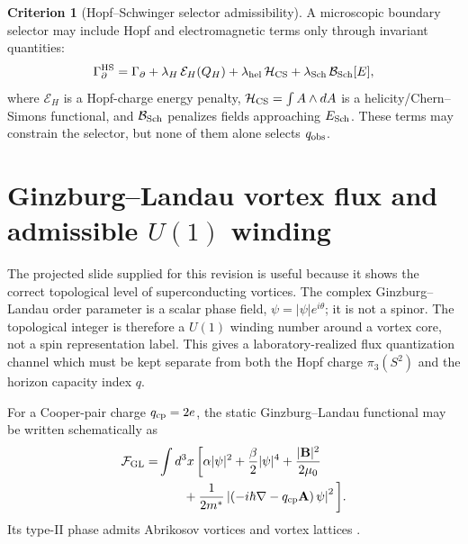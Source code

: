 \documentclass[aps,prd,reprint,nofootinbib,superscriptaddress,floatfix]{revtex4-2}
\numberwithin{equation}{section}
\theoremstyle{definition}
\newtheorem{criterion}{Criterion}[section]
\theoremstyle{plain}
\begin{document}
\begin{criterion}[Hopf--Schwinger selector admissibility]
A microscopic boundary selector may include Hopf and electromagnetic
terms only through invariant quantities:
\begin{equation}
\Gamma_\partial^{\rm HS}
=
\Gamma_\partial
+
\lambda_H\,\mathcal E_H(Q_H)
+
\lambda_{\rm hel}\,\mathcal H_{\rm CS}
+
\lambda_{\rm Sch}\,\mathcal B_{\rm Sch}[E],
\end{equation}
where \(\mathcal E_H\) is a Hopf-charge energy penalty,
\(\mathcal H_{\rm CS}=\int A\wedge dA\) is a helicity/Chern--Simons
functional, and \(\mathcal B_{\rm Sch}\) penalizes fields approaching
\(E_{\rm Sch}\).  These terms may constrain the selector, but none of
them alone selects \(q_{\rm obs}\).
\end{criterion}





\section{\texorpdfstring{Ginzburg--Landau vortex flux and admissible \(U(1)\) winding}{Ginzburg--Landau vortex flux and admissible U(1) winding}}
\label{sec:gl-vortex-admissibility}

The projected slide supplied for this revision is useful because it shows the
correct topological level of superconducting vortices.  The complex
Ginzburg--Landau order parameter is a scalar phase field,
\(\psi=|\psi|e^{i\theta}\); it is not a spinor.  The topological integer is
therefore a \(U(1)\) winding number around a vortex core, not a spin
representation label.  This gives a laboratory-realized flux quantization
channel which must be kept separate from both the Hopf charge
\(\pi_3(S^2)\) and the horizon capacity index \(q\).

For a Cooper-pair charge \(q_{\rm cp}=2e\), the static Ginzburg--Landau
functional may be written schematically as
\begin{align}
\mathcal F_{\rm GL}
=&
\int d^3x\,
\bigg[
\alpha |\psi|^2+\frac{\beta}{2}|\psi|^4
+\frac{|\mathbf B|^2}{2\mu_0}
\nonumber\\
&\hspace{7mm}
+\frac{1}{2m^*}
\left|
\left(-i\hbar\nabla-q_{\rm cp}\mathbf A\right)\psi
\right|^2
\bigg].
\end{align}
Its type-II phase admits Abrikosov vortices and vortex lattices
\cite{GinzburgLandau1950,Abrikosov2004,Tinkham2004}.
\end{document}
